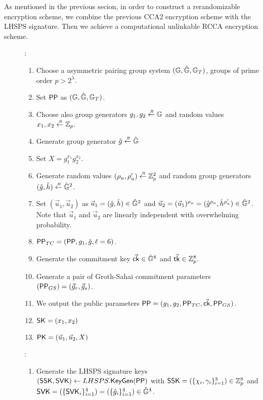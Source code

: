 As mentioned in the previous secion,
in order to construct a rerandomizable encryption scheme, we combine the previous CCA2 encryption scheme with the LHSPS signature. Then we achieve a computational unlinkable RCCA encryption scheme.

\begin{description}
\item[]:
  \begin{enumerate}
  \item Choose a asymmetric pairing group system $(\mathbb{G}, \hat{\mathbb{G}}, \mathbb{G}_T)$, groups of prime order $p > 2^\lambda$.
  \item Set $\mathsf{PP}$ as $(\mathbb{G}, \hat{\mathbb{G}}, \mathbb{G}_T)$.
  \item Choose also group generators $g_1, g_2 \stackrel{{\scriptscriptstyle \mkern4mu R}}{\gets} \mathbb{G}$ and random values $x_1, x_2 \stackrel{{\scriptscriptstyle \mkern4mu R}}{\gets} \mathbb{Z}_p$.
  \item Generate group generator $\hat{g} \stackrel{{\scriptscriptstyle \mkern4mu R}}{\gets} \hat{\mathbb{G}}$
  \item Set $X = g_1^{x_1}g_2^{x_2}$.
  \item Generate random values $(\rho_u, \rho_u') \stackrel{{\scriptscriptstyle \mkern4mu R}}{\gets} \mathbb{Z}_p^2$ and random group generators $(\hat{g}, \hat{h}) \stackrel{{\scriptscriptstyle \mkern4mu R}}{\gets} \hat{\mathbb{G}}^2$.
  \item Set $(\vec{u}_1, \vec{u}_2)$ as $\vec{u}_1 = (\hat{g}, \hat{h}) \in \hat{\mathbb{G}}^2$ and $\vec{u}_2 = (\vec{u}_1)^{\rho_u} = (\hat{g}^{\rho_u}, \hat{h}^{\rho_u'}) \in \hat{\mathbb{G}}^2$. Note that $\vec{u}_1$ and $\vec{u}_2$ are linearly independent with overwhelming probability.
  \item $\mathsf{PP}_{TC} = (\mathsf{PP}, g_1, \hat{g}, \ell = 6)$.
  \item Generate the commitment key $\vec{\mathsf{ck}} \in \hat{\mathbb{G}}^8$ and $\vec{\mathsf{tk}} \in \mathbb{Z}_p^8$.
  \item Generate a pair of Groth-Sahai commitment parameters$(\mathsf{PP}_{GS}) = (\vec{g}_r, \vec{g}_s)$.
  \item We output the public parameters $\mathsf{PP} =  (g_1, g_2, \mathsf{PP}_{TC}, \vec{\mathsf{ck}}, \mathsf{PP}_{GS})$.
  \item $\mathsf{SK} = (x_1, x_2)$
  \item $\mathsf{PK} = (\vec{u}_1, \vec{u}_2, X)$
  \end{enumerate}
\item[]:
  \begin{enumerate}
  \item Generate the LHSPS signature keys $(\mathsf{SSK}, \mathsf{SVK}) \gets LHSPS.{\mathsf{KeyGen}}(\mathsf{PP})$ with $\mathsf{SSK} = (\{\chi_i, \gamma_i\}_{i=1}^3) \in \mathbb{Z}_p^{8}$ and $\mathsf{SVK} = (\{\mathsf{SVK}_i\}_{i=1}^4) = (\{\hat{g}_i\}_{i =1}^4) \in \hat{\mathbb{G}}^4$.

\end{enumerate}
\end{description}
